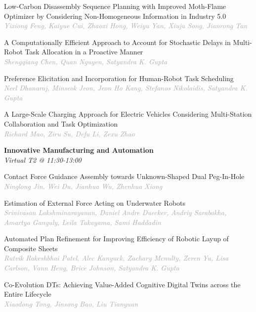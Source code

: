 \begin{multicols*}{2}
\small Low-Carbon Disassembly Sequence Planning with Improved Moth-Flame Optimizer by Considering Non-Homogeneous Information in Industry 5.0\\ 
\footnotesize \textcolor{darkgray}{\textit{Yixiong Feng, Kaiyue  Cui, Zhaoxi  Hong, Weiyu  Yan, Xiuju  Song, Jianrong  Tan}}

\small A Computationally Efficient Approach to Account for Stochastic Delays in Multi-Robot Task Allocation in a Proactive Manner\\ 
\footnotesize \textcolor{darkgray}{\textit{Shengqiang Chen, Quan  Nguyen, Satyandra K.  Gupta}}

\small Preference Elicitation and Incorporation for Human-Robot Task Scheduling\\ 
\footnotesize \textcolor{darkgray}{\textit{Neel Dhanaraj, Minseok  Jeon, Jeon Ho  Kang, Stefanos  Nikolaidis, Satyandra K.  Gupta}}

\small A Large-Scale Charging Approach for Electric Vehicles Considering Multi-Station Collaboration and Task Optimization\\ 
\footnotesize \textcolor{darkgray}{\textit{Richard Mao, Ziru  Su, Defu  Li, Zexu  Zhao}}

\normalsize \textbf{Innovative Manufacturing and Automation}\\
\small \textit{Virtual T2 @ 11:30-13:00}

\small Contact Force Guidance Assembly towards Unknown-Shaped Dual Peg-In-Hole\\ 
\footnotesize \textcolor{darkgray}{\textit{Ninglong Jin, Wei  Du, Jianhua  Wu, Zhenhua  Xiong}}

\small Estimation of External Force Acting on Underwater Robots\\ 
\footnotesize \textcolor{darkgray}{\textit{Srinivasan Lakshminarayanan, Daniel Andre  Duecker, Andriy  Sarabakha, Amartya  Ganguly, Leila  Takayama, Sami  Haddadin}}

\small Automated Plan Refinement for Improving Efficiency of Robotic Layup of Composite Sheets\\ 
\footnotesize \textcolor{darkgray}{\textit{Rutvik Rakeshbhai Patel, Alec  Kanyuck, Zachary  Mcnulty, Zeren  Yu, Lisa  Carlson, Vann  Heng, Brice  Johnson, Satyandra K.  Gupta}}

\small Co-Evolution DTs: Achieving Value-Added Cognitive Digital Twins across the Entire Lifecycle\\ 
\footnotesize \textcolor{darkgray}{\textit{Xiaodong Tong, Jinsong  Bao, Liu  Tianyuan}}


\end{multicols*}
